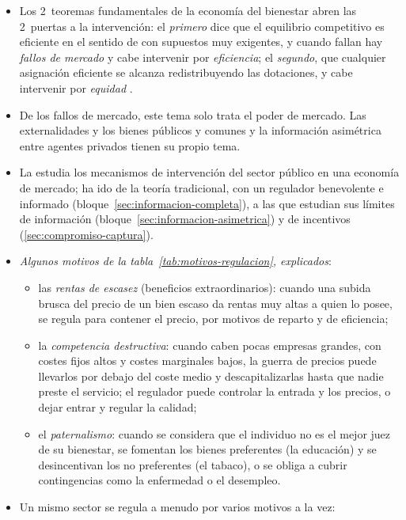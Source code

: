 \documentclass[11pt]{article}
\begin{document}
\begin{itemize}
\item Los 2~teoremas fundamentales de la economía del bienestar  abren las 2~puertas a la intervención: el \emph{primero} dice que el equilibrio competitivo es eficiente en el sentido de  con supuestos muy exigentes, y cuando fallan hay \emph{fallos de mercado} y cabe intervenir por \emph{eficiencia}; el \emph{segundo}, que cualquier asignación eficiente se alcanza redistribuyendo las dotaciones, y cabe intervenir por \emph{equidad} .
\item De los fallos de mercado, este tema solo trata el poder de mercado. Las externalidades y los bienes públicos y comunes  y la información asimétrica entre agentes privados  tienen su propio tema.
\item La  estudia los mecanismos de intervención del sector público en una economía de mercado; ha ido de la teoría tradicional, con un regulador benevolente e informado (bloque~\ref{sec:informacion-completa}), a las que estudian sus límites de información (bloque~\ref{sec:informacion-asimetrica}) y de incentivos (\ref{sec:compromiso-captura}).
\item \emph{Algunos motivos de la tabla~\ref{tab:motivos-regulacion}, explicados}:
  \begin{itemize}
  \item las \emph{rentas de escasez} (beneficios extraordinarios): cuando una subida brusca del precio de un bien escaso da rentas muy altas a quien lo posee, se regula para contener el precio, por motivos de reparto y de eficiencia;
  \item la \emph{competencia destructiva}: cuando caben pocas empresas grandes, con costes fijos altos y costes marginales bajos, la guerra de precios puede llevarlos por debajo del coste medio y descapitalizarlas hasta que nadie preste el servicio; el regulador puede controlar la entrada y los precios, o dejar entrar y regular la calidad;
  \item el \emph{paternalismo}: cuando se considera que el individuo no es el mejor juez de su bienestar, se fomentan los bienes preferentes (la educación) y se desincentivan los no preferentes (el tabaco), o se obliga a cubrir contingencias como la enfermedad o el desempleo.
  \end{itemize}
\item Un mismo sector se regula a menudo por varios motivos a la vez:
  \begin{itemize}

\end{itemize}
\end{itemize}
\end{document}
